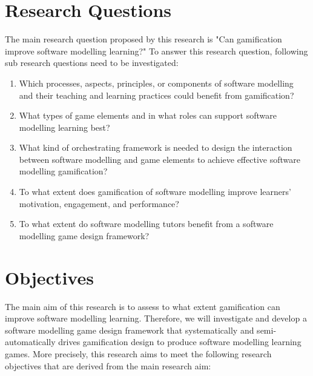 \documentclass[12pt, a4paper]{report}
\begin{document}
\section{Research Questions}
The main research question proposed by this research is "Can gamification improve software modelling learning?" To answer this research question, following sub research questions need to be investigated:
\begin{enumerate}
\item Which processes, aspects, principles, or components of software modelling and their teaching and learning practices could benefit from gamification?
\item What types of game elements and in what roles can support software modelling learning best? 
\item What kind of orchestrating framework is needed to design the interaction between software modelling and game elements to achieve effective software modelling gamification?
\item To what extent does gamification of software modelling improve learners' motivation, engagement, and performance?
\item To what extent do software modelling tutors benefit from a software modelling game design framework?
\end{enumerate}

\section{Objectives}
The main aim of this research is to assess to what extent gamification can improve software modelling learning. Therefore, we will investigate and develop a software modelling game design framework that systematically and semi-automatically drives gamification design to produce software modelling learning games. More precisely, this research aims to meet the following research objectives that are derived from the main research aim:
\end{document}
